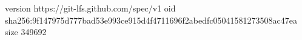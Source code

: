 version https://git-lfs.github.com/spec/v1
oid sha256:9f147975d777bad53e993ce915d4f4711696f2abedfc05041581273508ac47ea
size 349692
